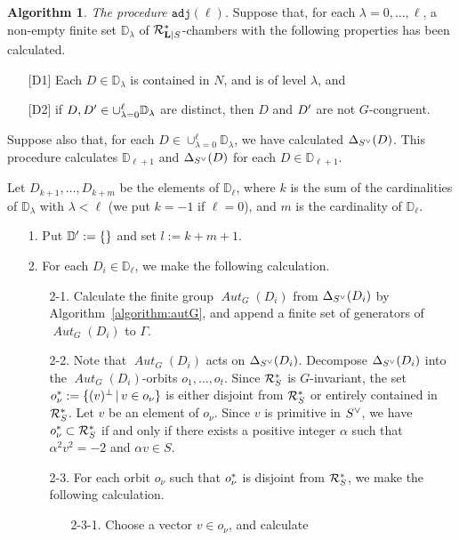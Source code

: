 \documentclass{amsart}
\theoremstyle{plain}
\theoremstyle{definition}
\newtheorem{algorithm}[theorem]{Algorithm}
\theoremstyle{remark}
\numberwithin{equation}{section}
\numberwithin{table}{section}
\numberwithin{figure}{section}
\newcommand{\D}{\mathord{\mathbb D}}
\newcommand{\RRR}{\mathord{\mathcal R}}
\newcommand{\shortset}[2]{\{ {#1} \,|\, {#2}   \}}
\newcommand{\sprime}{\sp\prime}
\newcommand{\sperp}{\sp{\perp}}
\newcommand{\dual}{\sp{\vee}}
\renewcommand{\L}{\mathord{\mathbf{L}}}
\newcommand{\aut}{\operatorname{\mathit {Aut}}\nolimits}
\newcommand{\autG}{\aut_G}
\newcommand{\Chams}{\D}
\newcommand{\Roots}{\RRR}
\newcommand{\sphyp}{\sp*}
\newcommand{\procadj}{\mathord{\mathtt{adj}}}
\newcommand{\RtsLS}{\Roots_{\L|S}}
\newcommand{\Nc}{N}
\begin{document}
\begin{algorithm}
{\it The procedure $\procadj(\ell)$.}
Suppose  that,
for  each $\lambda=0, \dots, \ell$,
a non-empty finite set $\Chams_{\lambda}$ of $\RtsLS\sphyp$-chambers with the following properties 
has been calculated.
\begin{itemize}
\item[\textrm{[D1]}] Each $D\in \Chams_{\lambda}$ is contained in $\Nc$,  and is of level $\lambda$, and 
\item[\textrm{[D2]}] if $D, D\sprime \in \cup_{\lambda=0}^{\ell}\Chams_{\lambda}$ are distinct,
then $D$ and $D\sprime$ are not $G$-congruent.
\end{itemize}
Suppose also that, for each $D \in \cup_{\lambda=0}^{\ell} \Chams_{\lambda}$,
we have calculated  $\Delta_{S\dual} (D)$.
This procedure calculates  $\Chams_{\ell+1}$ and $\Delta_{S\dual} (D)$  for each $D\in \Chams_{\ell+1}$.
\par
Let $D_{k+1}, \dots, D_{k+m}$ be the elements of $\Chams_{\ell}$, 
where $k$ is the sum of the cardinalities of $\Chams_{\lambda}$ with $\lambda<\ell$
(we put $k=-1$ if $\ell=0$), 
and $m$ is the cardinality of $\Chams_{\ell}$.
%
\begin{itemize}
\item[1.]
Put  $\Chams\sprime:=\{\}$ and set $l:=k+m+1$.
\item[2.]
For each $D_{i}\in \Chams_{\ell}$,
we make the following calculation.
\begin{itemize}
\item[2-1.]
Calculate the finite group $\autG(D_{i})$ from $\Delta_{S\dual}(D_{i})$
by Algorithm~\ref{algorithm:autG}, 
and append a finite set of generators  of $\autG(D_{i})$ to $\varGamma$.
\item[2-2.]
Note that $\autG(D_{i})$ acts on $\Delta_{S\dual}(D_{i})$.
Decompose   $\Delta_{S\dual}(D_{i})$ into the $\autG(D_{i})$-orbits
$o_1, \dots, o_t$.
Since $\Roots_S\sphyp$ is  $G$-invariant,
the set  $o_{\nu}\sphyp:=\shortset{(v)\sperp}{v\in o_{\nu}}$ 
is either disjoint from  $\Roots_S\sphyp$ or entirely contained in $\Roots_S\sphyp$.
Let $v$ be an element of $o_{\nu}$.
Since $v$ is primitive in $S\dual$,
we have $o_{\nu}\sphyp\subset \Roots_S\sphyp$
if and only if there exists a positive  integer $\alpha$ such that $\alpha^2 v^2=-2$ and $\alpha v\in S$.
\item[2-3.]
For each orbit $o_{\nu}$ such that $o_{\nu}\sphyp$ is  disjoint from  $\Roots_S\sphyp$,
we make the following calculation.
\begin{itemize}
\item[2-3-1.] Choose a  vector  $v \in o_{\nu}$, and calculate 

\end{itemize}
\end{itemize}
\end{itemize}
\end{algorithm}
\end{document}
